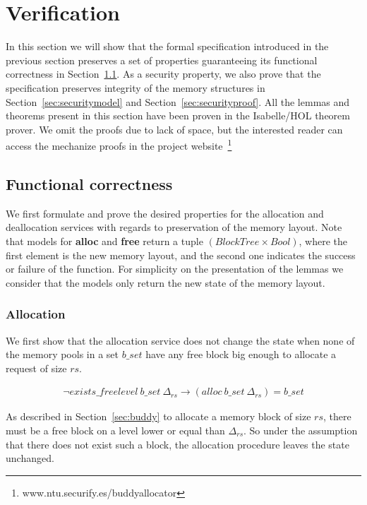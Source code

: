 \section{Verification}
In this section we will show that the formal specification introduced in the previous section preserves a set of properties guaranteeing its functional correctness in Section~\ref{sec:functional}. As a security property, we also prove that the specification preserves integrity of the memory structures in Section~\ref{sec:securitymodel} and Section~\ref{sec:securityproof}.
All the lemmas and theorems present in this section have been proven in the Isabelle/HOL theorem prover. We omit the proofs due to lack of space, but the interested reader can access the mechanize proofs in the project website~\footnote{www.ntu.securify.es/buddyallocator}

\subsection{Functional correctness}\label{sec:functional}
We first formulate and prove the desired properties for the allocation and deallocation services with regards to preservation of the memory layout. Note that models for \textbf{alloc} and \textbf{free} return a tuple $(BlockTree \times Bool)$, where the first element is the new memory layout, and the second one indicates the success or failure of the function. For simplicity on the presentation of the lemmas we consider that the models only return the new state of the memory layout.
\subsubsection{Allocation}\label{sec:functionalalloc}

We first show that the allocation service does not change the state when none of the memory pools in a set $b\_set$ have any free block big enough to allocate a request of size $rs$. 

\begin{lemma} 
\label{lemma:no_free_space}
\end{lemma}
\vspace{-7pt}
{\footnotesize
\begin{align*}
\neg exists\_freelevel\ b\_set\ \Delta_{rs} \longrightarrow (alloc\ b\_set\ \Delta_{rs}) = b\_set
\end{align*}
}
\vspace{-12pt}

As described in Section~\ref{sec:buddy} to allocate a memory block of size $rs$, there must be a free block on a level lower or equal than $\Delta_{rs}$. So under the assumption that there does not exist such a block, the allocation procedure leaves the state unchanged.

